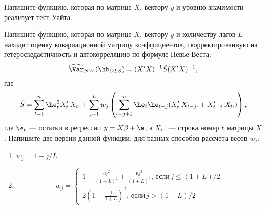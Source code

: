 \documentclass[pdftex,11pt,openany]{book}\usepackage[]{graphicx}\usepackage[]{color}
\begin{document}
\begin{solution}
\end{solution}


\begin{problem}
Напишите функцию, которая по матрице $X$, вектору $y$ и уровню
значимости реализует тест Уайта.
\end{problem}

\begin{solution}
\end{solution}


\begin{problem}
Напишите функцию, которая по матрице $X$, вектору $y$ и количеству лагов $L$ находит оценку ковариационной матрицу  коэффициентов, скорректированную на гетероскедастичность и автокорреляцию по формуле Невье-Веста:
\[
\widehat{\Var}_{NW}(\hb_{OLS})=(X'X)^{-1}\hat{S}(X'X)^{-1},
\]
где
\[
\hat{S}=\sum_{t=1}^{n}\he_t^2 X_{t\cdot}'X_{t\cdot}+
                     \sum_{j=1}^L w_j \left(\sum_{t=j+1}^n  \he_t \he_{t-j}(X_{t\cdot}'X_{t-j\cdot}+X_{t-j\cdot}'X_{t\cdot})  \right),
\]
где $\e_t$ --- остатки в регрессии $y=X\beta+\e$, а $X_{t\cdot}$ --- строка номер $t$ матрицы $X$.
Напишите две версии данной функции, для разных способов рассчета весов $w_j$:
\begin{enumerate}
\item $w_j=1-j/L$
\item 
\[
w_j=\begin{cases}
1-\frac{6j^2}{(1+L)^2}+\frac{6j^3}{(1+L)^3},\, \text{если}\,  j\leq (1+L)/2 \\
2\left(1-\frac{j}{1+L} \right)^2,\, \text{если}\, j>(1+L)/2
\end{cases}
\]
\end{enumerate}
\end{problem}

\begin{solution}
\end{solution}



\restorechapter

\end{document}
